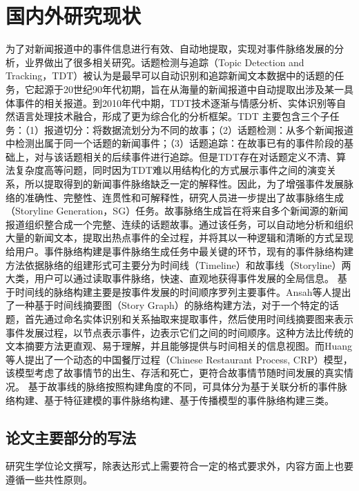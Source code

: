 \section{国内外研究现状}

为了对新闻报道中的事件信息进行有效、自动地提取，实现对事件脉络发展的分析，业界做出了很多相关研究。话题检测与追踪（Topic Detection and Tracking，TDT）被认为是最早可以自动识别和追踪新闻文本数据中的话题的任务，它起源于20世纪90年代初期，旨在从海量的新闻报道中自动提取出涉及某一具体事件的相关报道\cite{TDT}。到2010年代中期，TDT技术逐渐与情感分析、实体识别等自然语言处理技术融合，形成了更为综合化的分析框架。TDT 主要包含三个子任务：（1）报道切分：将数据流划分为不同的故事；（2）话题检测：从多个新闻报道中检测出属于同一个话题的新闻事件；（3）话题追踪：在故事已有的事件阶段的基础上，对与该话题相关的后续事件进行追踪。但是TDT存在对话题定义不清、算法复杂度高等问题，同时因为TDT难以用结构化的方式展示事件之间的演变关系，所以提取得到的新闻事件脉络缺乏一定的解释性\cite{TDT-disad}。因此，为了增强事件发展脉络的准确性、完整性、连贯性和可解释性，研究人员进一步提出了故事脉络生成（Storyline Generation，SG）任务\cite{SG}。故事脉络生成旨在将来自多个新闻源的新闻报道组织整合成一个完整、连续的话题故事。通过该任务，可以自动地分析和组织大量的新闻文本，提取出热点事件的全过程，并将其以一种逻辑和清晰的方式呈现给用户。事件脉络构建是事件脉络生成任务中最关键的环节，现有的事件脉络构建方法依据脉络的组建形式可主要分为时间线（Timeline）和故事线（Storyline）两大类，用户可以通过读取事件脉络，快速、直观地获得事件发展的全局信息。
基于时间线的脉络构建主要是按事件发展的时间顺序罗列主要事件。Ansah等人\cite{Ansah}提出了一种基于时间线摘要图（Story Graph）的脉络构建方法，对于一个特定的话题，首先通过命名实体识别和关系抽取来提取事件，然后使用时间线摘要图来表示事件发展过程，以节点表示事件，边表示它们之间的时间顺序。这种方法比传统的文本摘要方法更直观、易于理解，并且能够提供与时间相关的信息视图。而Huang等人\cite{CRP}提出了一个动态的中国餐厅过程（Chinese Restaurant Process, CRP）模型，该模型考虑了故事情节的出生、存活和死亡，更符合故事情节随时间发展的真实情况。
基于故事线的脉络按照构建角度的不同，可具体分为基于关联分析的事件脉络构建、基于特征建模的事件脉络构建、基于传播模型的事件脉络构建三类\cite{model-category}。

\subsection{论文主要部分的写法}

研究生学位论文撰写，除表达形式上需要符合一定的格式要求外，内容方面上也要遵循一些共性原则。

